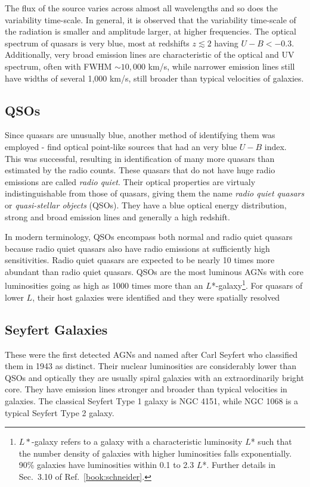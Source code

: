 \documentclass[a4paper,11pt]{report}
\newcommand{\ti}[1]{\textit{#1}}
\begin{document}
The flux of the source varies across almost all wavelengths and so does the variability time-scale. In general, it is observed that the variability time-scale of the radiation is smaller and amplitude larger, at higher frequencies. The optical spectrum of quasars is very blue, most at redshifts $z \lesssim 2$ having $U - B < -0.3$. Additionally, very broad emission lines are characteristic of the optical and UV spectrum, often with FWHM $\sim 10,000$ km/s, while narrower emission lines still have widths of several 1,000 km/s, still broader than typical velocities of galaxies.

\subsection{QSOs}
Since quasars are unusually blue, another method of identifying them was employed - find optical point-like sources that had an very blue $U-B$ index. This was successful, resulting in identification of many more quasars than estimated by the radio counts. These quasars that do not have huge radio emissions are called \ti{radio quiet}. Their optical properties are virtualy indistinguishable from those of quasars, giving them the name \ti{radio quiet quasars} or \ti{quasi-stellar objects} (QSOs). They have a blue optical energy distribution, strong and broad emission lines and generally a high redshift.

\vspace{1em}

In modern terminology, QSOs encompass both normal and radio quiet quasars because radio quiet quasars also have radio emissions at sufficiently high sensitivities. Radio quiet quasars are expected to be nearly 10 times more abundant than radio quiet quasars. QSOs are the most luminous AGNs with core luminosities going as high as 1000 times more than an $L$*-galaxy\footnote{$L*$-galaxy refers to a galaxy with a characteristic luminosity $L$* such that the number density of galaxies with higher luminosities falls exponentially. 90\% galaxies have luminosities within 0.1 to 2.3 $L$*. Further details in Sec.~3.10 of Ref.~\ref{book:schneider}.}. For quasars of lower $L$, their host galaxies were identified and they were spatially resolved

\subsection{Seyfert Galaxies}
These were the first detected AGNs and named after Carl Seyfert who classified them in 1943 as distinct. Their nuclear luminosities are considerably lower than QSOs and optically they are usually spiral galaxies with an extraordinarily bright core. They have emission lines stronger and broader than typical velocities in galaxies. The classical Seyfert Type 1 galaxy is NGC 4151, while NGC 1068 is a typical Seyfert Type 2 galaxy.
\end{document}
